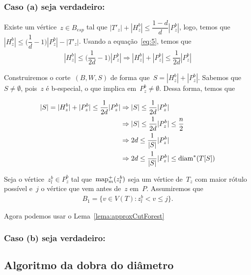 	\bigskip
	\bigskip
	
	\subsubsection*{Caso (a) seja verdadeiro:}
		Existe um vértice~$z\in B_{esp}$ 
		tal que ${|T'_{z}|+|H_z^b|\le
		\dfrac{1-d}{d}|P_z^b|}$, logo, temos
		que~${|H^b_z|\le \Big(\dfrac{1}{d}-1\Big)|P^b_z|-|T'_z|}$.
		Usando a equação~\ref{eq:5}, temos 
		que
		\begin{align}
			|H^b_z|\le\Big(\dfrac{1}{2d}-1\Big)|P^b_z|
			\Rightarrow
			|H^b_z|+|P^b_z|\le\dfrac{1}{2d}|P^b_z| \nonumber
		\end{align}

		Construiremos o corte~$(B,W,S)$ de forma 
		que~$S = |H^b_z|+|P^b_z|$.
		Sabemos que~$S\ne \emptyset$, pois~$z$ é b-especial,
		o que implica em~$P^b_z\ne \emptyset$. 
		Dessa forma, temos que

		\begin{align}
			|S| = |H^b_z|+|P^b_z|\le\dfrac{1}{2d}|P^b_z|
			&\Rightarrow
			|S| \le\dfrac{1}{2d}|P^b_z| \nonumber \\
			&\Rightarrow
			|S| \le\dfrac{1}{2d}|P^b_z|\le \dfrac{n}{2} 
			\label{eq:metade} \\
			&\Rightarrow
			2d\le \dfrac{1}{|S|}|P^b_z|  
			\label{eq:reaproveitaCaminho}\\
			&\Rightarrow
			2d\le \dfrac{1}{|S|}|P^b_z|\le \mathrm{diam}^*(T[S]) 
			\nonumber
		\end{align}


		Seja o vértice~${z^b_l\in P^b_z}$ tal 
		que~$\mathrm{map}^+_m(z^b_l)$ seja um vértice de~$T_z$ com 
		maior rótulo possível e~$j$ o vértice que vem
		antes de~$z$ em~$P$. Assumiremos que
		\begin{align}
			B_1 = \Big\{ v\in V(T):z^b_l<v\le j \Big\}
			\nonumber.
		\end{align}

		Agora podemos usar o Lema~\ref{lema:approxCutForest}

	\bigskip
	\bigskip
	
	\subsubsection*{Caso (b) seja verdadeiro:}


	\bigskip
	\bigskip
	\bigskip

	\subsection{Algoritmo da dobra do diâmetro}
	\begin{algorithm}[H]
	\label{alg:dobraDiametro}

		\caption{}
		\Output{}

	\end{algorithm}	